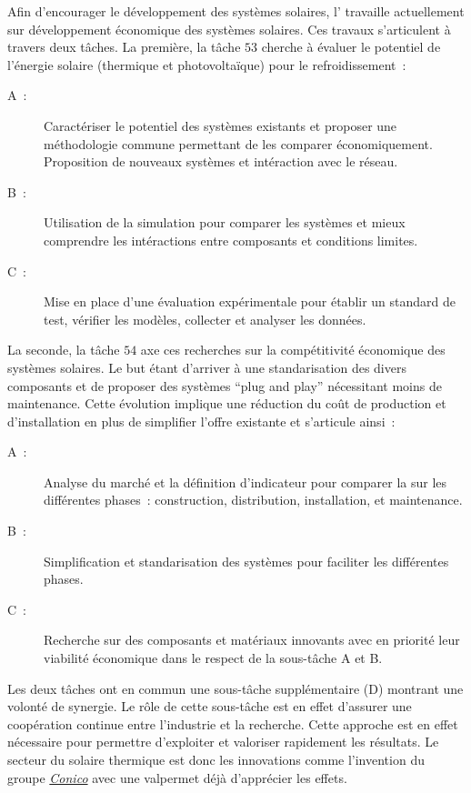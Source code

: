 Afin d’encourager le développement des systèmes solaires, l’ travaille
actuellement sur développement économique des systèmes solaires. Ces travaux s’articulent
à travers deux tâches. La première, la tâche $53$ cherche à évaluer le potentiel
de l’énergie solaire (thermique et photovoltaïque) pour le refroidissement~:
\begin{description}
    \item[A~:] Caractériser le potentiel des systèmes existants et proposer une méthodologie
                commune permettant de les comparer économiquement. Proposition de nouveaux
                systèmes et intéraction avec le réseau.
    \item[B~:] Utilisation de la simulation pour comparer les systèmes et mieux
                comprendre les intéractions entre composants et conditions limites.
    \item[C~:] Mise en place d’une évaluation expérimentale pour établir un standard
                de test, vérifier les modèles, collecter et analyser les données.
\end{description}
La seconde, la tâche $54$ axe ces recherches sur la compétitivité économique des
systèmes solaires. Le but étant d’arriver à une standarisation des
divers composants et de proposer des systèmes \enquote{plug and play} nécessitant
moins de maintenance. Cette évolution implique une réduction du coût de production
et d’installation en plus de simplifier l’offre existante et s’articule ainsi~:
\begin{description}
    \item [A~:] Analyse du marché et la définition d’indicateur pour comparer la
                sur les différentes phases~: construction, distribution, installation, et maintenance.
    \item [B~:] Simplification et standarisation des systèmes pour faciliter les différentes
                phases.
    \item [C~:] Recherche sur des composants et matériaux innovants avec en priorité
                leur viabilité économique dans le respect de la sous-tâche A et B.
\end{description}
Les deux tâches ont en commun une sous-tâche supplémentaire (D) montrant une volonté
de synergie. Le rôle de cette sous-tâche est en effet d’assurer une coopération
continue entre l’industrie et la recherche. Cette approche est en effet nécessaire
pour permettre d’exploiter et valoriser rapidement les résultats.
Le secteur du solaire thermique est donc les innovations
comme l’invention du groupe \href{http://www.iea-shc.org/article?NewsID=177}{\textit{Conico}}
avec une valpermet déjà d’apprécier les effets.

